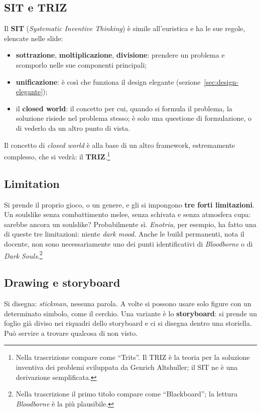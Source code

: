 \subsection{SIT e TRIZ}

Il \textbf{SIT} (\emph{Systematic Inventive Thinking}) è simile all'euristica e
ha le sue regole, elencate nelle slide:
\begin{itemize}
  \item \textbf{sottrazione}, \textbf{moltiplicazione}, \textbf{divisione}:
        prendere un problema e scomporlo nelle sue componenti principali;
  \item \textbf{unificazione}: è così che funziona il design elegante
        (sezione~\ref{sec:design-elegante});
  \item il \textbf{closed world}: il concetto per cui, quando si formula il
        problema, la soluzione risiede nel problema stesso; è solo una
        questione di formulazione, o di vederlo da un altro punto di vista.
\end{itemize}
Il concetto di \emph{closed world} è alla base di un altro framework,
estremamente complesso, che si vedrà: il \textbf{TRIZ}.\footnote{Nella
trascrizione compare come ``Trits''. Il TRIZ è la teoria per la soluzione
inventiva dei problemi sviluppata da Genrich Altshuller; il SIT ne è una
derivazione semplificata.}

\subsection{Limitation}

Si prende il proprio gioco, o un genere, e gli si impongono \textbf{tre forti
limitazioni}. Un soulslike senza combattimento melee, senza schivata e senza
atmosfera cupa: sarebbe ancora un soulslike? Probabilmente sì.
\emph{Enotria}, per esempio, ha fatto una di queste tre limitazioni: niente
\emph{dark mood}. Anche le build permanenti, nota il docente, non sono
necessariamente uno dei punti identificativi di \emph{Bloodborne} o di
\emph{Dark Souls}.\footnote{Nella trascrizione il primo titolo compare come
``Blackboard''; la lettura \emph{Bloodborne} è la più plausibile.}

\subsection{Drawing e storyboard}

Si disegna: \emph{stickman}, nessuna parola. A volte si possono usare solo
figure con un determinato simbolo, come il cerchio. Una variante è lo
\textbf{storyboard}: si prende un foglio già diviso nei riquadri dello
storyboard e ci si disegna dentro una storiella. Può servire a trovare
qualcosa di non visto.

